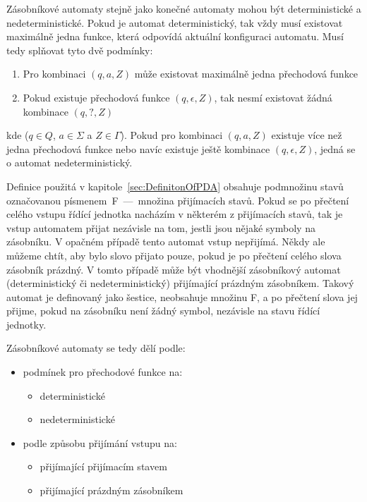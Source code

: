 Zásobníkové automaty stejně jako konečné automaty mohou být deterministické a nedeterministické. Pokud je automat deterministický, tak vždy musí existovat maximálně jedna funkce, která odpovídá aktuální konfiguraci automatu. Musí tedy splňovat tyto dvě podmínky:
\begin{enumerate}
    \item Pro kombinaci $(q,a,Z)$ může existovat maximálně jedna přechodová funkce
    \item Pokud existuje přechodová funkce $(q,\epsilon,Z)$, tak nesmí existovat žádná kombinace $(q,?,Z)$
\end{enumerate}
kde ($q \in Q$, $a \in \Sigma$ a $Z \in \Gamma$). Pokud pro kombinaci $(q,a,Z)$ existuje více než jedna přechodová funkce nebo navíc existuje ještě kombinace $(q,\epsilon,Z)$, jedná se o automat nedeterministický.

Definice použitá v kapitole~\ref{sec:DefinitonOfPDA} obsahuje podmnožinu stavů označovanou písmenem~F~---~množina přijímacích stavů. Pokud se po přečtení celého vstupu řídící jednotka nacházím v některém z přijímacích stavů, tak je vstup automatem přijat nezávisle na tom, jestli jsou nějaké symboly na zásobníku. V opačném případě tento automat vstup nepřijímá. Někdy ale můžeme chtít, aby bylo slovo přijato pouze, pokud je po přečtení celého slova zásobník prázdný. V tomto případě může být vhodnější zásobníkový automat (deterministický či nedeterministický) přijímající prázdným zásobníkem. Takový automat je definovaný jako šestice, neobsahuje množinu F, a po přečtení slova jej přijme, pokud na zásobníku není žádný symbol, nezávisle na stavu řídící jednotky.

Zásobníkové automaty se tedy dělí podle:
\begin{itemize}
    \item podmínek pro přechodové funkce na:
        \begin{itemize}
            \item deterministické
            \item nedeterministické
        \end{itemize}
    \item podle způsobu přijímání vstupu na:
        \begin{itemize}
            \item přijímající přijímacím stavem
            \item přijímající prázdným zásobníkem
        \end{itemize}
\end{itemize}

